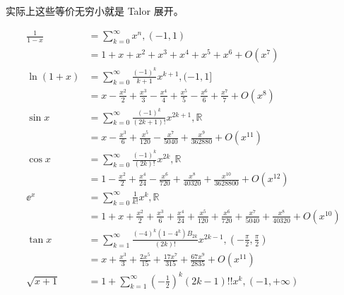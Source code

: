 实际上这些等价无穷小就是 Talor 展开。

\[
	\begin{aligned}
		\frac{1}{1-x} & = \sum_{k=0}^\infty x^n,(-1,1)                                                                                                                  \\
		              & = 1 + x + x^2 + x^3 + x^4 + x^5 + x^6 + O(x^7)                                                                                                  \\
		\ln(1+x)      & = \sum_{k=0}^\infty\frac{(-1)^k}{k+1}x^{k+1},(-1,1]                                                                                             \\
		              & = x - \frac{x^2}{2} + \frac{x^3}{3} - \frac{x^4}{4} + \frac{x^5}{5} - \frac{x^6}{6} + \frac{x^7}{7} + O(x^8)                                    \\
		\sin x        & = \sum_{k=0}^\infty \frac{(-1)^k}{(2k+1)!}x^{2k+1},\mathbb{R}                                                                                   \\
		              & = x - \frac{x^3}{6} + \frac{x^5}{120} - \frac{x^7}{5040} + \frac{x^9}{362880}+ O(x^{11})                                                        \\
		\cos x        & = \sum_{k=0}^\infty \frac{(-1)^k}{(2k)!}x^{2k},\mathbb{R}                                                                                       \\
		              & = 1 - \frac{x^2}{2} + \frac{x^4}{24} - \frac{x^6}{720} + \frac{x^8}{40320} + \frac{x^{10}}{3628800} + O(x^{12})                                 \\
		\ee^x         & = \sum_{k=0}^\infty\frac{1}{k!}x^k,\mathbb{R}                                                                                                   \\
		              & = 1 + x + \frac{x^2}{2} + \frac{x^3}{6} + \frac{x^4}{24} + \frac{x^5}{120} + \frac{x^6}{720} + \frac{x^7}{5040} + \frac{x^8}{40320} + O(x^{10}) \\
		\tan x        & = \sum_{k=1}^\infty \frac{(-4)^k(1-4^k)B_{2k}}{(2k)!}x^{2k-1},(-\frac{\pi}{2},\frac{\pi}{2})                                                    \\
		              & = x + \frac{x^3}{3} + \frac{2x^5}{15} + \frac{17x^{7}}{315} + \frac{67x^9}{2835} + O(x^{11})                                                    \\
		\sqrt{x+1}    & = 1 + \sum_{k=1}^\infty \left(-\frac{1}{2}\right)^k (2k-1)!!x^k,(-1, +\infty)                                                                   \\

\end{aligned}\]
